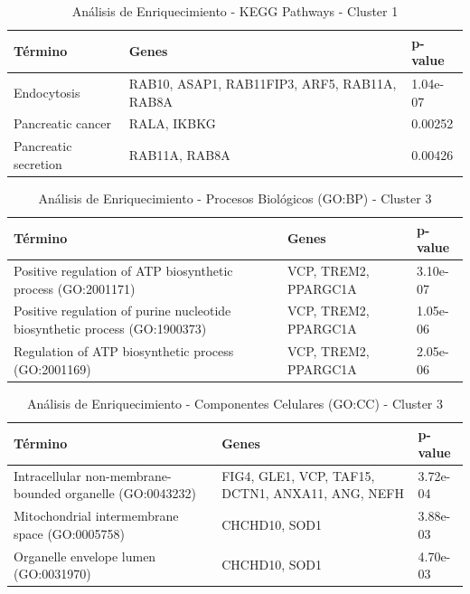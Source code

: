 \begin{table}[H]
	\centering
	\caption{Análisis de Enriquecimiento - KEGG Pathways - Cluster 1}
	\label{tb:c1_t4}
	\begin{tabular}{|p{4cm}|p{4cm}|p{3cm}|}
		\hline
		\textbf{Término} & \textbf{Genes} & \textbf{p-value} \\ \hline
		Endocytosis & RAB10, ASAP1, RAB11FIP3, ARF5, RAB11A, RAB8A & 1.04e-07 \\ \hline
		Pancreatic cancer & RALA, IKBKG & 0.00252 \\ \hline
		Pancreatic secretion & RAB11A, RAB8A & 0.00426 \\ \hline
	\end{tabular}
\end{table}


\begin{table}[H]
	\centering
	\caption{Análisis de Enriquecimiento - Procesos Biológicos (GO:BP) - Cluster 3}
	\label{tb:c2_t1}
	\begin{tabular}{|p{4cm}|p{4cm}|p{3cm}|}
		\hline
		\textbf{Término} & \textbf{Genes} & \textbf{p-value} \\ \hline
		Positive regulation of ATP biosynthetic process (GO:2001171) & VCP, TREM2, PPARGC1A & 3.10e-07 \\ \hline
		Positive regulation of purine nucleotide biosynthetic process (GO:1900373) & VCP, TREM2, PPARGC1A & 1.05e-06 \\ \hline
		Regulation of ATP biosynthetic process (GO:2001169) & VCP, TREM2, PPARGC1A & 2.05e-06 \\ \hline
	\end{tabular}
\end{table}

\begin{table}[H]
	\centering
	\caption{Análisis de Enriquecimiento - Componentes Celulares (GO:CC) - Cluster 3}
	\label{tb:c2_t2}
	\begin{tabular}{|p{4cm}|p{4cm}|p{3cm}|}
		\hline
		\textbf{Término} & \textbf{Genes} & \textbf{p-value} \\ \hline
		Intracellular non-membrane-bounded organelle (GO:0043232) & FIG4, GLE1, VCP, TAF15, DCTN1, ANXA11, ANG, NEFH & 3.72e-04 \\ \hline
		Mitochondrial intermembrane space (GO:0005758) & CHCHD10, SOD1 & 3.88e-03 \\ \hline
		Organelle envelope lumen (GO:0031970) & CHCHD10, SOD1 & 4.70e-03 \\ \hline
	\end{tabular}
\end{table}


